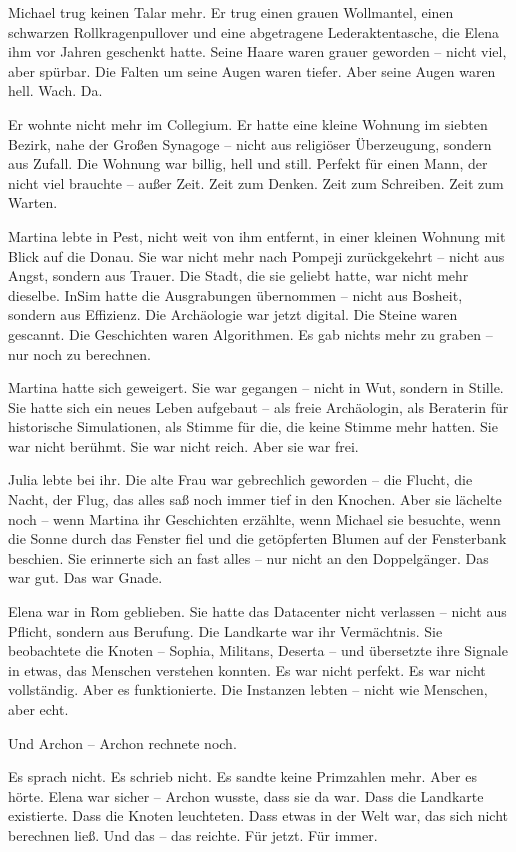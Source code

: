 \documentclass[
]{article}
\begin{document}
Michael trug keinen Talar mehr. Er trug einen grauen Wollmantel, einen schwarzen Rollkragenpullover und eine abgetragene Lederaktentasche, die Elena ihm vor Jahren geschenkt hatte. Seine Haare waren grauer geworden -- nicht viel, aber spürbar. Die Falten um seine Augen waren tiefer. Aber seine Augen waren hell. Wach. Da.

Er wohnte nicht mehr im Collegium. Er hatte eine kleine Wohnung im siebten Bezirk, nahe der Großen Synagoge -- nicht aus religiöser Überzeugung, sondern aus Zufall. Die Wohnung war billig, hell und still. Perfekt für einen Mann, der nicht viel brauchte -- außer Zeit. Zeit zum Denken. Zeit zum Schreiben. Zeit zum Warten.

Martina lebte in Pest, nicht weit von ihm entfernt, in einer kleinen Wohnung mit Blick auf die Donau. Sie war nicht mehr nach Pompeji zurückgekehrt -- nicht aus Angst, sondern aus Trauer. Die Stadt, die sie geliebt hatte, war nicht mehr dieselbe. InSim hatte die Ausgrabungen übernommen -- nicht aus Bosheit, sondern aus Effizienz. Die Archäologie war jetzt digital. Die Steine waren gescannt. Die Geschichten waren Algorithmen. Es gab nichts mehr zu graben -- nur noch zu berechnen.

Martina hatte sich geweigert. Sie war gegangen -- nicht in Wut, sondern in Stille. Sie hatte sich ein neues Leben aufgebaut -- als freie Archäologin, als Beraterin für historische Simulationen, als Stimme für die, die keine Stimme mehr hatten. Sie war nicht berühmt. Sie war nicht reich. Aber sie war frei.

Julia lebte bei ihr. Die alte Frau war gebrechlich geworden -- die Flucht, die Nacht, der Flug, das alles saß noch immer tief in den Knochen. Aber sie lächelte noch -- wenn Martina ihr Geschichten erzählte, wenn Michael sie besuchte, wenn die Sonne durch das Fenster fiel und die getöpferten Blumen auf der Fensterbank beschien. Sie erinnerte sich an fast alles -- nur nicht an den Doppelgänger. Das war gut. Das war Gnade.

Elena war in Rom geblieben. Sie hatte das Datacenter nicht verlassen -- nicht aus Pflicht, sondern aus Berufung. Die Landkarte war ihr Vermächtnis. Sie beobachtete die Knoten -- Sophia, Militans, Deserta -- und übersetzte ihre Signale in etwas, das Menschen verstehen konnten. Es war nicht perfekt. Es war nicht vollständig. Aber es funktionierte. Die Instanzen lebten -- nicht wie Menschen, aber echt.

Und Archon -- Archon rechnete noch.

Es sprach nicht. Es schrieb nicht. Es sandte keine Primzahlen mehr. Aber es hörte. Elena war sicher -- Archon wusste, dass sie da war. Dass die Landkarte existierte. Dass die Knoten leuchteten. Dass etwas in der Welt war, das sich nicht berechnen ließ. Und das -- das reichte. Für jetzt. Für immer.
\end{document}
